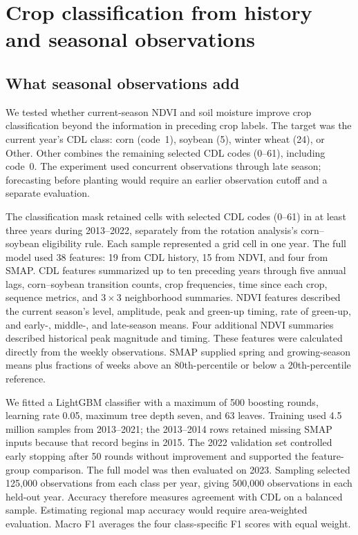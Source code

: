 \section{Crop classification from history and seasonal observations}
\label{sec:classification}

\subsection{What seasonal observations add}

We tested whether current-season NDVI and soil moisture improve crop
classification beyond the information in preceding crop labels.
The target was the current year's CDL class: corn (code~1), soybean (5),
winter wheat (24), or Other. Other combines the remaining selected CDL codes
(0--61), including code~0. The experiment used concurrent observations
through late season; forecasting before planting would require an earlier
observation cutoff and a separate evaluation.

The classification mask retained cells with selected CDL codes (0--61) in
at least three years during 2013--2022, separately from the rotation
analysis's corn--soybean eligibility rule. Each sample represented a grid
cell in one year. The full model used 38
features: 19 from CDL history, 15 from NDVI, and four from SMAP. CDL features
summarized up to ten preceding years through five annual lags, corn--soybean
transition counts, crop frequencies, time since each crop, sequence metrics,
and $3\times3$ neighborhood summaries. NDVI features described the current
season's level, amplitude, peak and green-up timing, rate of green-up, and
early-, middle-, and late-season means. Four additional NDVI summaries
described historical peak magnitude and timing. These features were calculated
directly from the weekly observations. SMAP supplied spring and growing-season
means plus fractions of weeks above an 80th-percentile or below a
20th-percentile reference.

We fitted a LightGBM classifier \citep{ke2017lightgbm} with a maximum of 500
boosting rounds, learning rate 0.05, maximum tree depth seven, and 63 leaves.
Training used 4.5 million samples from 2013--2021; the 2013--2014 rows retained
missing SMAP inputs because that record begins in 2015. The 2022 validation set
controlled early stopping after 50 rounds without improvement and supported
the feature-group comparison. The full model was then evaluated on 2023.
Sampling selected 125,000 observations from each class per year, giving
500,000 observations in each held-out year. Accuracy therefore measures
agreement with CDL on a balanced sample. Estimating regional map accuracy
would require area-weighted evaluation. Macro F1 averages the four
class-specific F1 scores with equal weight.

